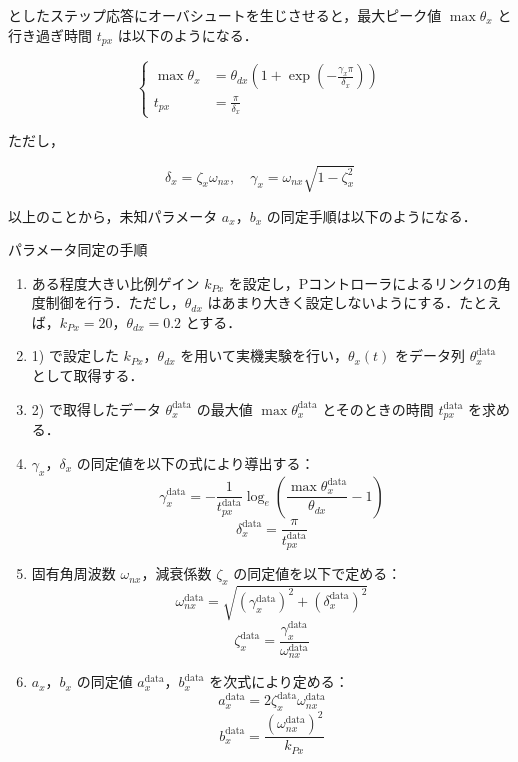 としたステップ応答にオーバシュートを生じさせると，最大ピーク値 $\max \theta_x$ と行き過ぎ時間 $t_{px}$ は以下のようになる．

\begin{equation}
    \left\{
    \begin{aligned}
        \max \theta_x &= \theta_{dx} \left(1 + \exp\left(-\frac{\gamma_x \pi}{\delta_x} \right) \right) \\
        t_{px} &= \frac{\pi}{\delta_x}
    \end{aligned}
    \right. \tag{4.6}
\end{equation}

ただし，

\begin{equation}
    \delta_x = \zeta_x \omega_{nx}, \quad \gamma_x = \omega_{nx} \sqrt{1 - \zeta_x^2} \tag{4.7}
\end{equation}

以上のことから，未知パラメータ $a_x$，$b_x$ の同定手順は以下のようになる．

パラメータ同定の手順
    \begin{enumerate}
        \item ある程度大きい比例ゲイン $k_{Px}$ を設定し，Pコントローラによるリンク1の角度制御を行う．ただし，$\theta_{dx}$ はあまり大きく設定しないようにする．たとえば，$k_{Px} = 20$，$\theta_{dx} = 0.2$ とする．
    
        \item 1) で設定した $k_{Px}$，$\theta_{dx}$ を用いて実機実験を行い，$\theta_x(t)$ をデータ列 $\theta_x^{\mathrm{data}}$ として取得する．
    
        \item 2) で取得したデータ $\theta_x^{\mathrm{data}}$ の最大値 $\max \theta_x^{\mathrm{data}}$ とそのときの時間 $t_{px}^{\mathrm{data}}$ を求める．
    
        \item $\gamma_x$，$\delta_x$ の同定値を以下の式により導出する：
        \[
            \gamma_x^{\mathrm{data}} = -\frac{1}{t_{px}^{\mathrm{data}}} \log_e \left( \frac{\max \theta_x^{\mathrm{data}}}{\theta_{dx}} - 1 \right) \tag{4.8}
        \]
        \[
            \delta_x^{\mathrm{data}} = \frac{\pi}{t_{px}^{\mathrm{data}}} \tag{4.9}
        \]
    
        \item 固有角周波数 $\omega_{nx}$，減衰係数 $\zeta_x$ の同定値を以下で定める：
        \[
            \omega_{nx}^{\mathrm{data}} = \sqrt{ (\gamma_x^{\mathrm{data}})^2 + (\delta_x^{\mathrm{data}})^2 } \tag{4.10}
        \]
        \[
            \zeta_x^{\mathrm{data}} = \frac{\gamma_x^{\mathrm{data}}}{\omega_{nx}^{\mathrm{data}}} \tag{4.11}
        \]
    
        \item $a_x$，$b_x$ の同定値 $a_x^{\mathrm{data}}$，$b_x^{\mathrm{data}}$ を次式により定める：
        \[
            a_x^{\mathrm{data}} = 2 \zeta_x^{\mathrm{data}} \omega_{nx}^{\mathrm{data}} \tag{4.12}
        \]
        \[
            b_x^{\mathrm{data}} = \frac{(\omega_{nx}^{\mathrm{data}})^2}{k_{Px}} \tag{4.13}
        \]
    \end{enumerate}
    
